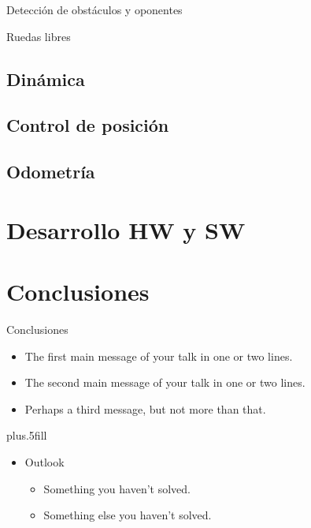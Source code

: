 \documentclass{beamer}
\begin{document}
\begin{frame}{Detección de obstáculos y oponentes}
\end{frame}

\begin{frame}{Ruedas libres}
\end{frame}



\subsection{Dinámica}
\subsection{Control de posición}
\subsection{Odometría}

\section{Desarrollo HW y SW}

\appendix
\section*{Conclusiones}

\begin{frame}{Conclusiones}

  \begin{itemize}
  \item
    The \alert{first main message} of your talk in one or two lines.
  \item
    The \alert{second main message} of your talk in one or two lines.
  \item
    Perhaps a \alert{third message}, but not more than that.
  \end{itemize}
  
  \vskip0pt plus.5fill
  \begin{itemize}
  \item
    Outlook
    \begin{itemize}
    \item
      Something you haven't solved.
    \item
      Something else you haven't solved.
    \end{itemize}
  \end{itemize}
\end{frame}
\end{document}
